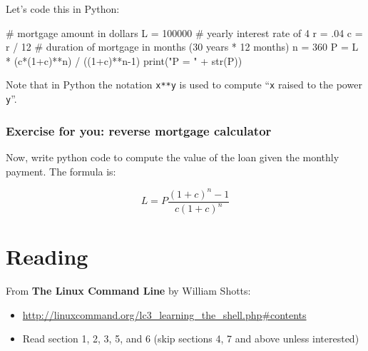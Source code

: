 \documentclass[12pt,letterpaper,twoside]{article}
\begin{document}
Let's code this in Python:

\begin{python}
# mortgage amount in dollars
L = 100000
# yearly interest rate of 4%
r = .04
c = r / 12
# duration of mortgage in months (30 years * 12 months)
n = 360
P = L * (c*(1+c)**n) / ((1+c)**n-1)
print("P = " + str(P))
\end{python}

Note that in Python the notation \texttt{x**y} is used to compute
``\texttt{x} raised to the power \texttt{y}''.

\subsubsection{Exercise for you: reverse mortgage calculator}

Now, write python code to compute the value of the loan given the
monthly payment. The formula is:

\[
L = P \frac{(1+c)^n-1}{c(1+c)^n}
\]

\section{Reading}
From \textbf{The Linux Command Line} by William Shotts: 

\begin{itemize}
\item \url{http://linuxcommand.org/lc3_learning_the_shell.php\#contents}
\item Read section 1, 2, 3, 5, and 6 (skip sections 4, 7 and above unless
interested)
\end{itemize}



\end{document}
